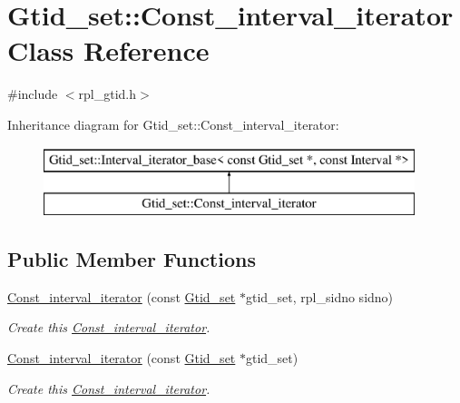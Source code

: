 \hypertarget{classGtid__set_1_1Const__interval__iterator}{}\section{Gtid\+\_\+set\+:\+:Const\+\_\+interval\+\_\+iterator Class Reference}
\label{classGtid__set_1_1Const__interval__iterator}


{\ttfamily \#include $<$rpl\+\_\+gtid.\+h$>$}

Inheritance diagram for Gtid\+\_\+set\+:\+:Const\+\_\+interval\+\_\+iterator\+:\begin{figure}[H]
\begin{center}
\leavevmode
\includegraphics[height=2.000000cm]{classGtid__set_1_1Const__interval__iterator}
\end{center}
\end{figure}
\subsection*{Public Member Functions}
\begin{DoxyCompactItemize}
\item 
\mbox{\label{classGtid__set_1_1Const__interval__iterator_a515dc66125544645940ffcd8a485ca1e}} 
\mbox{\hyperlink{classGtid__set_1_1Const__interval__iterator_a515dc66125544645940ffcd8a485ca1e}{Const\+\_\+interval\+\_\+iterator}} (const \mbox{\hyperlink{classGtid__set}{Gtid\+\_\+set}} $\ast$gtid\+\_\+set, rpl\+\_\+sidno sidno)
\begin{DoxyCompactList}\small\item\em Create this \mbox{\hyperlink{classGtid__set_1_1Const__interval__iterator}{Const\+\_\+interval\+\_\+iterator}}. \end{DoxyCompactList}\item 
\mbox{\label{classGtid__set_1_1Const__interval__iterator_a1ade845d9c9c0d8eb2f9b1bb4fd70b6d}} 
\mbox{\hyperlink{classGtid__set_1_1Const__interval__iterator_a1ade845d9c9c0d8eb2f9b1bb4fd70b6d}{Const\+\_\+interval\+\_\+iterator}} (const \mbox{\hyperlink{classGtid__set}{Gtid\+\_\+set}} $\ast$gtid\+\_\+set)
\begin{DoxyCompactList}\small\item\em Create this \mbox{\hyperlink{classGtid__set_1_1Const__interval__iterator}{Const\+\_\+interval\+\_\+iterator}}. \end{DoxyCompactList}\end{DoxyCompactItemize}
